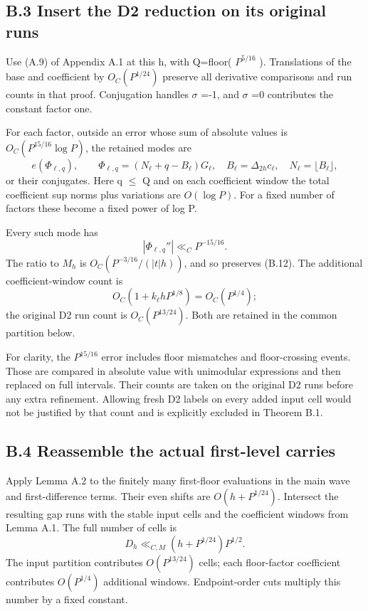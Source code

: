 \documentclass[11pt,a4paper]{article}
\begin{document}
\subsection{B.3 Insert the D2 reduction on its original
runs}\label{b.3-insert-the-d2-reduction-on-its-original-runs}

Use (A.9) of Appendix A.1 at this h, with Q=floor( \(P^{5/16}\) ).
Translations of the base and coefficient by \(O_C(P^{1/24})\) preserve
all derivative comparisons and run counts in that proof. Conjugation
handles \(\sigma\) =-1, and \(\sigma\) =0 contributes the constant
factor one.

For each factor, outside an error whose sum of absolute values is
\(O_C(P^{15/16} \log P)\), the retained modes are \[
e(\Phi_{\ell,q}),\qquad
\Phi_{\ell,q}=(N_\ell+q-B_\ell)G_\ell,\quad
B_\ell=\Delta_{2h}c_\ell,\quad N_\ell=\lfloor B_\ell\rfloor ,
\] or their conjugates. Here \textbar q\textbar{} \(\le\) Q and on each
coefficient window the total coefficient sup norms plus variations are
\(O(\log P)\). For a fixed number of factors these become a fixed power
of log P.

Every such mode has \[
|\Phi_{\ell,q}''|\ll_C P^{-15/16}. \tag{B.13}
\] The ratio to \(M_h\) is \(O_C(P^{-3/16}/(|t|h))\), and so preserves
(B.12). The additional coefficient-window count is \[
O_C(1+k_\ell hP^{1/8})=O_C(P^{1/4});
\] the original D2 run count is \(O_C(P^{13/24})\). Both are retained in
the common partition below.

For clarity, the \(P^{15/16}\) error includes floor mismatches and
floor-crossing events. Those are compared in absolute value with
unimodular expressions and then replaced on full intervals. Their counts
are taken on the original D2 runs before any extra refinement. Allowing
fresh D2 labels on every added input cell would not be justified by that
count and is explicitly excluded in Theorem B.1.

\subsection{B.4 Reassemble the actual first-level
carries}\label{b.4-reassemble-the-actual-first-level-carries}

Apply Lemma A.2 to the finitely many first-floor evaluations in the main
wave and first-difference terms. Their even shifts are
\(O(h+P^{1/24})\). Intersect the resulting gap runs with the stable
input cells and the coefficient windows from Lemma A.1. The full number
of cells is \[
D_h\ll_{C,M}(h+P^{1/24})P^{1/2}. \tag{B.14}
\] The input partition contributes \(O(P^{13/24})\) cells; each
floor-factor coefficient contributes \(O(P^{1/4})\) additional windows.
Endpoint-order cuts multiply this number by a fixed constant.
\end{document}
